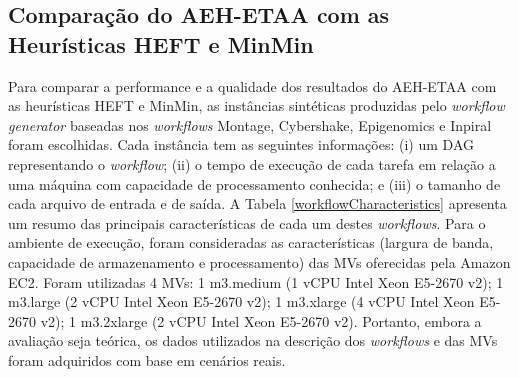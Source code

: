 	 

\subsection{Comparação do AEH-ETAA com as Heurísticas  HEFT e MinMin}\label{ssec:compT}

Para comparar a performance e a qualidade dos resultados do AEH-ETAA com as heurísticas HEFT e MinMin, as instâncias sintéticas produzidas pelo \textit{workflow generator} baseadas nos \textit{workflows} Montage, Cybershake, Epigenomics e Inpiral  \cite{juve2406180} foram escolhidas. Cada instância tem as seguintes informações: (i) um DAG representando o \textit{workflow}; (ii) o tempo de execução de cada tarefa em relação a uma máquina com capacidade de processamento conhecida; e (iii) o tamanho de cada arquivo de entrada e de saída. A Tabela \ref{workflowCharacteristics} apresenta um resumo das principais características de cada um destes \textit{workflows}. Para o ambiente de execução, foram consideradas as características (largura de banda, capacidade de armazenamento e processamento) das MVs oferecidas pela Amazon EC2. Foram utilizadas 4 MVs: 1 m3.medium (1 vCPU Intel Xeon E5-2670 v2); 1 m3.large (2 vCPU Intel Xeon E5-2670 v2); 1 m3.xlarge (4 vCPU Intel Xeon E5-2670 v2); 1 m3.2xlarge (2 vCPU Intel Xeon E5-2670 v2). Portanto, embora a avaliação seja teórica, os dados utilizados na descrição dos \textit{workflows} e das MVs foram adquiridos com base em cenários reais. 




